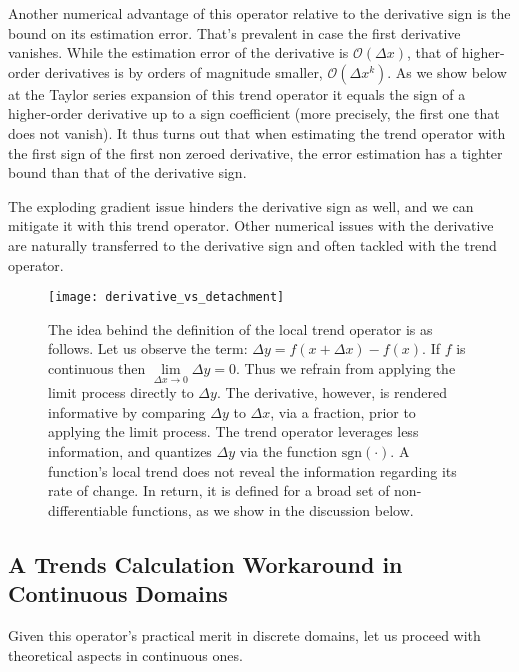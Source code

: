 \documentclass[11pt]{book}
\begin{document}
Another numerical advantage of this operator relative to the derivative sign is the bound on its estimation error. That's prevalent in case the first derivative vanishes. While the estimation error of the derivative is $\mathcal{O}\left(\Delta x\right)$, that of higher-order derivatives is by orders of magnitude smaller, $\mathcal{O}\left(\Delta x^k\right)$. As we show below at the Taylor series expansion of this trend operator it equals the sign of a higher-order derivative up to a sign coefficient (more precisely, the first one that does not vanish). It thus turns out that when estimating the trend operator with the first sign of the first non zeroed derivative, the error estimation has a tighter bound than that of the derivative sign.

The exploding gradient issue hinders the derivative sign as well, and we can mitigate it with this trend operator. Other numerical issues with the derivative are naturally transferred to the derivative sign and often tackled with the trend operator.

\begin{figure}[H]
\texttt{[image: derivative\_vs\_detachment]}
\caption{The idea behind the definition of the local trend operator is as follows. Let us observe the term: $\Delta y=f(x+\Delta x)-f(x)$. If $f$ is continuous then $\underset{\Delta x \to 0}{\lim}\Delta y = 0$. Thus we refrain from applying the limit process directly to $\Delta y$. The derivative, however, is rendered informative by comparing $\Delta y$ to $\Delta x$, via a fraction, prior to applying the limit process. The trend operator leverages less information, and quantizes $\Delta y$ via the function $\text{sgn}\left(\cdot\right)$. A function’s local trend does not reveal the information regarding its rate of change. In return, it is defined for a broad set of non-differentiable functions, as we show in the discussion below.}
\end{figure}

\subsection{A Trends Calculation Workaround in Continuous Domains}
Given this operator's practical merit in discrete domains, let us proceed with theoretical aspects in continuous ones.
\end{document}
